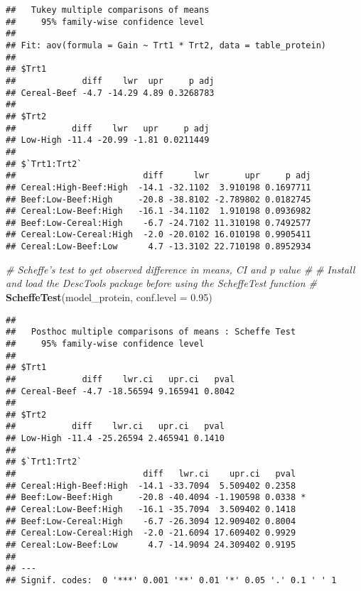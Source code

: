\documentclass[]{article}
\newenvironment{Shaded}{\begin{snugshade}}{\end{snugshade}}
\newcommand{\CommentTok}[1]{\textcolor[rgb]{0.56,0.35,0.01}{\textit{#1}}}
\newcommand{\DataTypeTok}[1]{\textcolor[rgb]{0.13,0.29,0.53}{#1}}
\newcommand{\FloatTok}[1]{\textcolor[rgb]{0.00,0.00,0.81}{#1}}
\newcommand{\KeywordTok}[1]{\textcolor[rgb]{0.13,0.29,0.53}{\textbf{#1}}}
\newcommand{\NormalTok}[1]{#1}
\begin{document}
\begin{verbatim}
##   Tukey multiple comparisons of means
##     95% family-wise confidence level
## 
## Fit: aov(formula = Gain ~ Trt1 * Trt2, data = table_protein)
## 
## $Trt1
##             diff    lwr  upr     p adj
## Cereal-Beef -4.7 -14.29 4.89 0.3268783
## 
## $Trt2
##           diff    lwr   upr     p adj
## Low-High -11.4 -20.99 -1.81 0.0211449
## 
## $`Trt1:Trt2`
##                         diff      lwr       upr     p adj
## Cereal:High-Beef:High  -14.1 -32.1102  3.910198 0.1697711
## Beef:Low-Beef:High     -20.8 -38.8102 -2.789802 0.0182745
## Cereal:Low-Beef:High   -16.1 -34.1102  1.910198 0.0936982
## Beef:Low-Cereal:High    -6.7 -24.7102 11.310198 0.7492577
## Cereal:Low-Cereal:High  -2.0 -20.0102 16.010198 0.9905411
## Cereal:Low-Beef:Low      4.7 -13.3102 22.710198 0.8952934
\end{verbatim}

\begin{Shaded}
\begin{Highlighting}[]
\CommentTok{# Scheffe's test to get observed difference in means, CI and p value #}
\CommentTok{# Install and load the DescTools package before using the ScheffeTest function #}
\KeywordTok{ScheffeTest}\NormalTok{(model_protein, }\DataTypeTok{conf.level =} \FloatTok{0.95}\NormalTok{)}
\end{Highlighting}
\end{Shaded}

\begin{verbatim}
## 
##   Posthoc multiple comparisons of means : Scheffe Test 
##     95% family-wise confidence level
## 
## $Trt1
##             diff    lwr.ci   upr.ci   pval    
## Cereal-Beef -4.7 -18.56594 9.165941 0.8042    
## 
## $Trt2
##           diff    lwr.ci   upr.ci   pval    
## Low-High -11.4 -25.26594 2.465941 0.1410    
## 
## $`Trt1:Trt2`
##                         diff   lwr.ci    upr.ci   pval    
## Cereal:High-Beef:High  -14.1 -33.7094  5.509402 0.2358    
## Beef:Low-Beef:High     -20.8 -40.4094 -1.190598 0.0338 *  
## Cereal:Low-Beef:High   -16.1 -35.7094  3.509402 0.1418    
## Beef:Low-Cereal:High    -6.7 -26.3094 12.909402 0.8004    
## Cereal:Low-Cereal:High  -2.0 -21.6094 17.609402 0.9929    
## Cereal:Low-Beef:Low      4.7 -14.9094 24.309402 0.9195    
## 
## ---
## Signif. codes:  0 '***' 0.001 '**' 0.01 '*' 0.05 '.' 0.1 ' ' 1
\end{verbatim}
\end{document}

